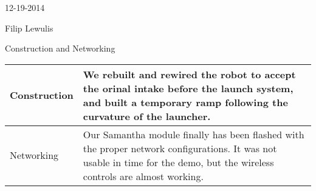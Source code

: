 12-19-2014

Filip Lewulis

Construction and Networking

\begin{tabular}{|p{5cm}|p{5cm}|}
\hline Construction &
We rebuilt and rewired the robot to accept the orinal intake before the launch system,
and built a temporary ramp following the curvature of the launcher. \\
\hline Networking &
Our Samantha module finally has been flashed with the proper network configurations. It
was not usable in time for the demo, but the wireless controls are almost working. \\
\hline
\end{tabular}